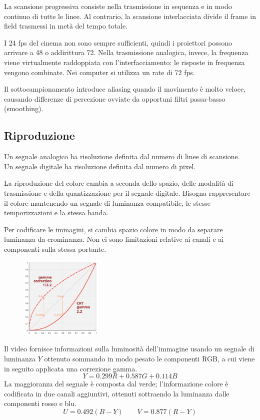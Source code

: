 La scansione progressiva consiste nella trasmissione in sequenza e in modo continuo di tutte le linee. Al contrario, la scansione interlacciata divide il frame in field trasmessi in metà del tempo totale.

I 24 fps del cinema non sono sempre sufficienti, quindi i proiettori possono arrivare a 48 o addirittura 72. Nella trasmissione analogica, invece, la frequenza viene virtualmente raddoppiata con l'interfacciamento: le risposte in frequenza vengono combinate. Nei computer si utilizza un rate di 72 fps.

Il sottocampionamento introduce aliasing quando il movimento è molto veloce, causando differenze di percezione ovviate da opportuni filtri passa-basso (smoothing). 

\subsection{Riproduzione}
Un segnale analogico ha risoluzione definita dal numero di linee di scansione. \\
Un segnale digitale ha risoluzione definita dal numero di pixel.

La riproduzione del colore cambia a seconda dello spazio, delle modalità di trasmissione e della quantizzazione per il segnale digitale. Bisogna rappresentare il colore mantenendo un segnale di luminanza compatibile, le stesse temporizzazioni e la stessa banda.

Per codificare le immagini, si cambia spazio colore in modo da separare luminanza da crominanza. Non ci sono limitazioni relative ai canali e ai componenti sulla stessa portante. 

 \begin{figure}
	\vspace{-15pt}
	\includegraphics[width=0.35\textwidth]{Lezioni/Immagini/gamma}
	\vspace{-20pt}
\end{figure}

Il video fornisce informazioni sulla luminosità dell'immagine usando un segnale di luminanza $Y$ ottenuto sommando in modo pesato le componenti RGB, a cui viene in seguito applicata una correzione gamma. 
$$ Y = 0.299R + 0.587G + 0.114B$$
La maggioranza del segnale è composta dal verde; l'informazione colore è codificata in due canali aggiuntivi, ottenuti sottraendo la luminanza dalle componenti rosso e blu.
$$ U = 0.492(B - Y) \qquad V = 0.877(R - Y)$$

